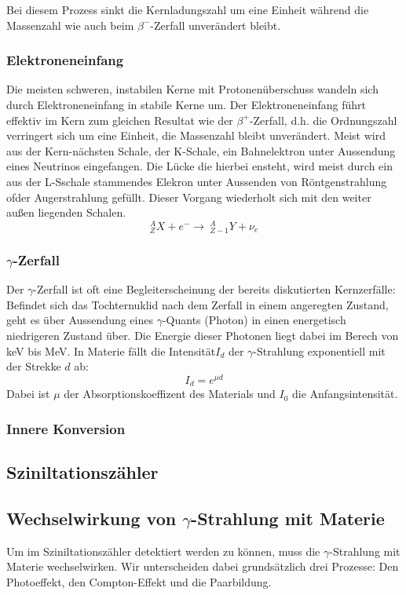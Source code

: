 \documentclass[12pt]{article}
\begin{document}
Bei diesem Prozess sinkt die Kernladungszahl um eine Einheit während die Massenzahl wie auch beim $\beta^-$-Zerfall unverändert bleibt.
\subsubsection{Elektroneneinfang}
Die meisten schweren, instabilen Kerne mit Protonenüberschuss wandeln sich durch Elektroneneinfang in stabile Kerne um.
Der Elektroneneinfang führt effektiv im Kern zum gleichen Resultat wie der $\beta^+$-Zerfall, d.h. die Ordnungszahl verringert sich um eine Einheit, die Massenzahl bleibt unverändert. Meist wird aus der Kern-nächsten Schale, der K-Schale, ein Bahnelektron unter Aussendung eines Neutrinos eingefangen. Die Lücke die hierbei ensteht, wird meist durch ein aus der L-Sschale stammendes Elekron unter Aussenden von Röntgenstrahlung ofder Augerstrahlung gefüllt. Dieser Vorgang wiederholt sich mit den weiter außen liegenden Schalen.
\[{}_Z^A X + e^- \rightarrow\ {}_{Z-1}^A Y + \nu_e\]
\subsubsection{$\gamma$-Zerfall}
Der $\gamma$-Zerfall ist oft eine Begleiterscheinung der bereits diskutierten Kernzerfälle: Befindet sich das Tochternuklid nach dem Zerfall in einem angeregten Zustand, geht es über Aussendung eines $\gamma$-Quants (Photon)  in einen energetisch niedrigeren Zustand über. Die Energie dieser Photonen liegt dabei im Berech von keV bis MeV. In Materie fällt die Intensität$I_d$ der $\gamma$-Strahlung exponentiell mit der Strekke $d$ ab:
\[I_d=e^{\mu d}\]
Dabei ist $\mu$ der Absorptionskoeffizent des Materials und $I_0$ die Anfangsintensität.
\subsubsection{Innere Konversion}










\subsection{Sziniltationszähler}






\subsection{Wechselwirkung von $\gamma$-Strahlung mit Materie}
Um im Sziniltationszähler detektiert werden zu können, muss die $\gamma$-Strahlung mit Materie wechselwirken. Wir unterscheiden dabei grundsätzlich drei Prozesse: Den Photoeffekt, den Compton-Effekt und die Paarbildung.
\end{document}
